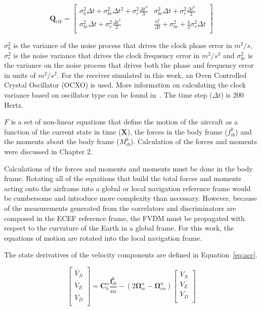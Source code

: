 \begin{equation}\label{eq:Qclk}
    \mathbf{Q}_{clk} =
    \begin{bmatrix}
        \sigma^2_b \Delta t + \sigma^2_{br}\Delta t^2 + \sigma^2_r \frac{\Delta t^3}{3} & \sigma^2_{br}\Delta t + \sigma^2_r \frac{\Delta t^2}{2}                      \\
        \sigma^2_{br} \Delta t + \sigma^2_r \frac{\Delta t^2}{2}                        & \frac{\sigma^2_r}{\Delta t} + \sigma^2_{br} + \frac{4}{3}\sigma^2_r \Delta t \\
    \end{bmatrix}
\end{equation}

\(\sigma^2_b\) is the variance of the noise process that drives the clock phase error in \(m^2/s\), \(\sigma^2_{r}\) is the noise variance that drives the clock frequency error in \(m^2/s^3\) and \(\sigma^2_{br}\) is the variance on the noise process that drives both the phase and frequency error in units of \(m^2/s^2\). For the receiver simulated in this work, an Oven Controlled Crystal Oscillator (OCXO) is used. More information on calculating the clock variance based on oscillator type can be found in~\cite{robertgroverbrownIntroductionRandomSignals2013}. The time step (\(\Delta t\)) is \(200\) Hertz.

\(F\) is a set of non-linear equations that define the motion of the aircraft as a function of the current state in time (\(\mathbf{X}\)), the forces in the body frame (\(f_{ib}^b\)) and the moments about the body frame (\(M_{ib}^b\)). Calculation of the forces and moments were discussed in Chapter 2.

Calculations of the forces and moments and moments must be done in the body frame. Rotating all of the equations that build the total forces and moments acting onto the airframe into a global or local navigation reference frame would be cumbersome and introduce more complexity than necessary. However, because of the measurements generated from the correlators and discriminators are composed in the ECEF reference frame, the FVDM must be propagated with respect to the curvature of the Earth in a global frame. For this work, the equations of motion are rotated into the local navigation frame.

The state derivatives of the velocity components are defined in Equation~\ref{eq:acc}.

\begin{equation}\label{eq:acc}
    \begin{bmatrix}
        \dot{V_N} \\
        \dot{V_E} \\
        \dot{V_D} \\
    \end{bmatrix} =
    \mathbf{C}_{b}^{n}\frac{\mathbf{f}_{ib}^b}{m} - \left(2\mathbf{\Omega}_{ie}^n - \mathbf{\Omega}_{en}^n\right)
    \begin{bmatrix}
        V_N \\
        V_E \\
        V_D \\
    \end{bmatrix}
\end{equation}

